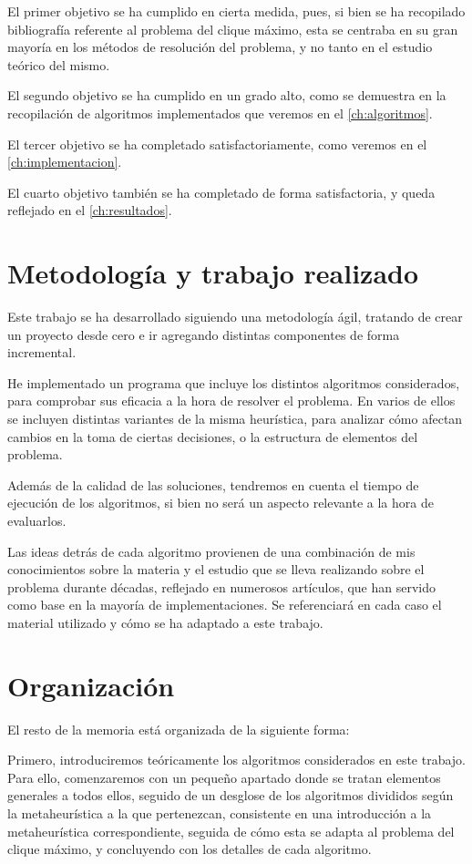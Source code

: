 El primer objetivo se ha cumplido en cierta medida, pues, si bien se ha recopilado
bibliografía referente al problema del clique máximo, esta se centraba en su gran
mayoría en los métodos de resolución del problema, y no tanto en el estudio teórico
del mismo.

El segundo objetivo se ha cumplido en un grado alto, como se demuestra en la recopilación
de algoritmos implementados que veremos en el \autoref{ch:algoritmos}.

El tercer objetivo se ha completado satisfactoriamente, como veremos en el \autoref{ch:implementacion}.

El cuarto objetivo también se ha completado de forma satisfactoria, y queda
reflejado en el \autoref{ch:resultados}.

\section{Metodología y trabajo realizado}

Este trabajo se ha desarrollado siguiendo una metodología ágil, tratando de crear
un proyecto desde cero e ir agregando distintas componentes de forma incremental.

He implementado un programa que incluye los distintos algoritmos considerados,
para comprobar sus eficacia a la hora de resolver el problema.
En varios de ellos se incluyen distintas variantes de la misma heurística, para
analizar cómo afectan cambios en la toma de ciertas decisiones, o la estructura
de elementos del problema.

Además de la calidad de las soluciones, tendremos en cuenta el tiempo de ejecución
de los algoritmos, si bien no será un aspecto relevante a la hora de evaluarlos.

Las ideas detrás de cada algoritmo provienen de una combinación de mis conocimientos
sobre la materia y el estudio que se lleva realizando sobre el problema durante décadas,
reflejado en numerosos artículos, que han servido como base en la mayoría de implementaciones.
Se referenciará en cada caso el material utilizado y cómo se ha adaptado a este trabajo.

\section{Organización}

El resto de la memoria está organizada de la siguiente forma:

Primero, introduciremos teóricamente los algoritmos considerados en este trabajo.
Para ello, comenzaremos con un pequeño apartado donde se tratan elementos generales a
todos ellos, seguido de un desglose de los algoritmos divididos según la metaheurística
a la que pertenezcan, consistente en una introducción a la metaheurística correspondiente,
seguida de cómo esta se adapta al problema del clique máximo, y concluyendo con los
detalles de cada algoritmo.

